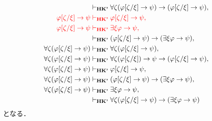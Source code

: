 	\begin{align}
		&\vdash_{{\scriptsize \mbox{{\bf HK'}}}} 
			\forall \zeta (\varphi[\zeta/\xi] \rightarrow \psi) 
			\rightarrow (\varphi[\zeta/\xi] \rightarrow \psi), \\
		\color{red}\varphi[\zeta/\xi] \rightarrow \psi &
		\color{red}\vdash_{{\scriptsize \mbox{{\bf HK'}}}}
			\varphi[\zeta/\xi] \rightarrow \psi, \\
		\color{red}\varphi[\zeta/\xi] \rightarrow \psi &
		\color{red}\vdash_{{\scriptsize \mbox{{\bf HK'}}}}
			\exists \xi \varphi \rightarrow \psi, \\
		&\vdash_{{\scriptsize \mbox{{\bf HK'}}}} (\varphi[\zeta/\xi] \rightarrow \psi) 
			\rightarrow (\exists \xi \varphi \rightarrow \psi), \\
		\forall \zeta (\varphi[\zeta/\xi] \rightarrow \psi)
			&\vdash_{{\scriptsize \mbox{{\bf HK'}}}} \forall \zeta (\varphi[\zeta/\xi] \rightarrow \psi), \\
		\forall \zeta (\varphi[\zeta/\xi] \rightarrow \psi)
			&\vdash_{{\scriptsize \mbox{{\bf HK'}}}} \forall \zeta (\varphi[\zeta/\xi]) \rightarrow \psi 
			\rightarrow (\varphi[\zeta/\xi] \rightarrow \psi), \\
		\forall \zeta (\varphi[\zeta/\xi] \rightarrow \psi)
			&\vdash_{{\scriptsize \mbox{{\bf HK'}}}} \varphi[\zeta/\xi] \rightarrow \psi, \\
		\forall \zeta (\varphi[\zeta/\xi] \rightarrow \psi)
			&\vdash_{{\scriptsize \mbox{{\bf HK'}}}} (\varphi[\zeta/\xi] \rightarrow \psi) 
			\rightarrow (\exists \xi \varphi \rightarrow \psi), \\
		\forall \zeta (\varphi[\zeta/\xi] \rightarrow \psi)
			&\vdash_{{\scriptsize \mbox{{\bf HK'}}}} \exists \xi \varphi \rightarrow \psi, \\
		&\vdash_{{\scriptsize \mbox{{\bf HK'}}}} \forall \zeta (\varphi[\zeta/\xi] \rightarrow \psi) 
		\rightarrow (\exists \xi \varphi \rightarrow \psi)
	\end{align}
	となる．